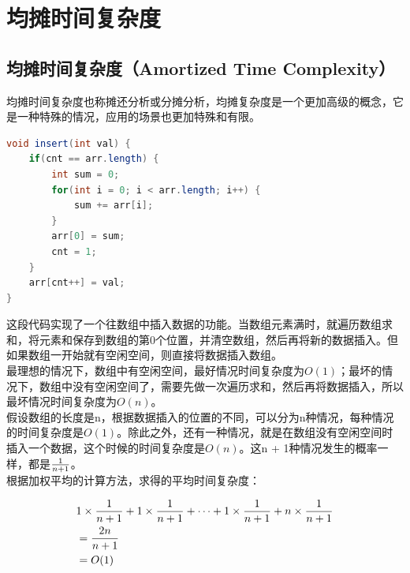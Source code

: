 \newpage

\section{均摊时间复杂度}

\subsection{均摊时间复杂度（Amortized Time Complexity）}

均摊时间复杂度也称摊还分析或分摊分析，均摊复杂度是一个更加高级的概念，它是一种特殊的情况，应用的场景也更加特殊和有限。

\vspace{-0.5cm}

\begin{lstlisting}[language=Java]
void insert(int val) {
    if(cnt == arr.length) {
        int sum = 0;
        for(int i = 0; i < arr.length; i++) {
            sum += arr[i];
        }
        arr[0] = sum;
        cnt = 1;
    }
    arr[cnt++] = val;
}
\end{lstlisting}

这段代码实现了一个往数组中插入数据的功能。当数组元素满时，就遍历数组求和，将元素和保存到数组的第0个位置，并清空数组，然后再将新的数据插入。但如果数组一开始就有空闲空间，则直接将数据插入数组。\\

最理想的情况下，数组中有空闲空间，最好情况时间复杂度为$ O(1) $；最坏的情况下，数组中没有空闲空间了，需要先做一次遍历求和，然后再将数据插入，所以最坏情况时间复杂度为$ O(n) $。\\

假设数组的长度是n，根据数据插入的位置的不同，可以分为n种情况，每种情况的时间复杂度是$ O(1) $。除此之外，还有一种情况，就是在数组没有空闲空间时插入一个数据，这个时候的时间复杂度是$ O(n) $。这n + 1种情况发生的概率一样，都是$ 1 \over n+1 $。\\

根据加权平均的计算方法，求得的平均时间复杂度：

\vspace{-0.5cm}

\begin{align*}
	 & 1 \times {1 \over n+1} + 1 \times {1 \over n+1} + \dots + 1 \times {1 \over n+1} + n \times {1 \over n+1} \\
	 & = {2n \over n+1}                                                                                          \\
	 & = O(1)
\end{align*}

